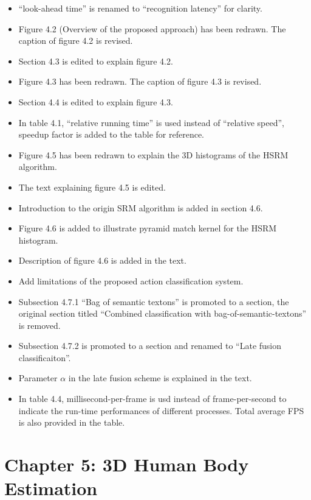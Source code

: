 \documentclass[10pt, a4paper]{article}
\begin{document}
\begin{itemize}
\item ``look-ahead time'' is renamed to ``recognition latency'' for clarity.
\item Figure 4.2 (Overview of the proposed approach) has been redrawn. The caption of figure 4.2 is revised.
\item Section 4.3 is edited to explain figure 4.2.
\item Figure 4.3 has been redrawn. The caption of figure 4.3 is revised.
\item Section 4.4 is edited to explain figure 4.3.
\item In table 4.1,  ``relative running time'' is used instead of ``relative speed'', speedup factor is added to the table for reference.
\item Figure 4.5 has been redrawn to explain the 3D histograms of the HSRM algorithm.
\item The text explaining figure 4.5 is edited.
\item Introduction to the origin SRM algorithm \cite{Ryoo2009} is added in section 4.6.
\item Figure 4.6 is added to illustrate pyramid match kernel for the HSRM histogram.
\item Description of figure 4.6 is added in the text.  
\item Add limitations of the proposed action classification system.  
\item Subsection 4.7.1 ``Bag of semantic textons'' is promoted to a section, the original section titled ``Combined classification with bag-of-semantic-textons'' is removed.
\item Subsection 4.7.2 is promoted to a section and renamed to ``Late fusion classificaiton''.
\item Parameter $\alpha$ in the late fusion scheme is explained in the text.
\item In table 4.4, millisecond-per-frame is usd instead of frame-per-second to indicate the run-time performances of different processes. Total average FPS is also provided in the table.
\end{itemize}

\section{Chapter 5: 3D Human Body Estimation}
\end{document}
